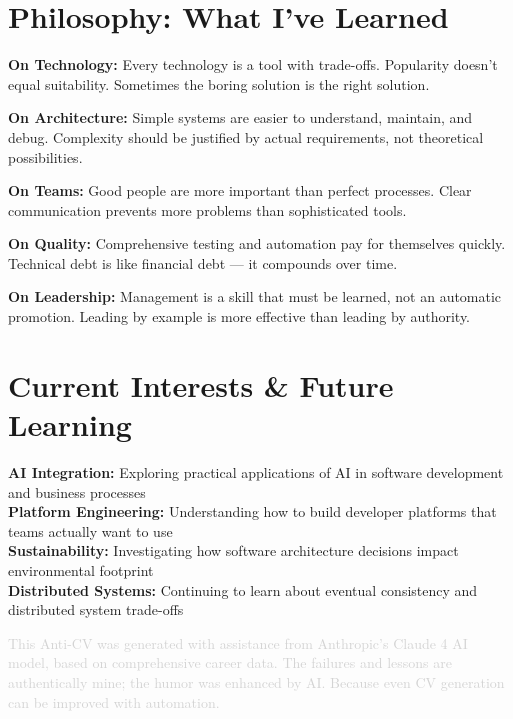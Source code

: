 \documentclass[11pt,a4paper]{article}
\begin{document}
\vspace{0.5em}

\section*{Philosophy: What I've Learned}

\textbf{On Technology:} Every technology is a tool with trade-offs. Popularity doesn't equal suitability. Sometimes the boring solution is the right solution.

\textbf{On Architecture:} Simple systems are easier to understand, maintain, and debug. Complexity should be justified by actual requirements, not theoretical possibilities.

\textbf{On Teams:} Good people are more important than perfect processes. Clear communication prevents more problems than sophisticated tools.

\textbf{On Quality:} Comprehensive testing and automation pay for themselves quickly. Technical debt is like financial debt --- it compounds over time.

\textbf{On Leadership:} Management is a skill that must be learned, not an automatic promotion. Leading by example is more effective than leading by authority.

\vspace{0.5em}

\section*{Current Interests \& Future Learning}

\textbf{AI Integration:} Exploring practical applications of AI in software development and business processes\\
\textbf{Platform Engineering:} Understanding how to build developer platforms that teams actually want to use\\
\textbf{Sustainability:} Investigating how software architecture decisions impact environmental footprint\\
\textbf{Distributed Systems:} Continuing to learn about eventual consistency and distributed system trade-offs

\vfill

\begin{center}
\textcolor{lightgray}{\small This Anti-CV was generated with assistance from Anthropic's Claude 4 AI model, based on comprehensive career data. The failures and lessons are authentically mine; the humor was enhanced by AI. Because even CV generation can be improved with automation.}
\end{center}
\end{document}

